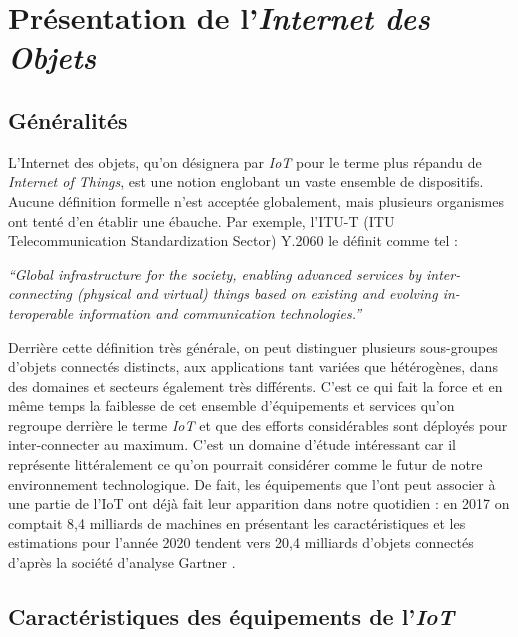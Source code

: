 \documentclass[]{article}
\begin{document}

\section{Présentation de l'\textit{Internet des Objets}}\label{IoT}

\subsection{Généralités}

\par L'Internet des objets, qu'on désignera par \textit{IoT} pour le terme plus répandu de \textit{Internet of Things}, est une notion englobant un vaste ensemble de dispositifs. Aucune définition formelle n'est acceptée globalement, mais plusieurs organismes ont tenté d'en établir une ébauche. Par exemple, l'ITU-T (ITU Telecommunication Standardization Sector) Y.2060 le définit comme tel : 
\begin{center}
\textit{“Global  infrastructure  for  the  society,  enabling  advanced  services  by  inter-connecting (physical and virtual) things based on existing and evolving in-teroperable information and communication technologies.”}
\end{center}

\par Derrière cette définition très générale, on peut distinguer plusieurs sous-groupes d'objets connectés distincts, aux applications tant variées que hétérogènes, dans des domaines et secteurs également très différents. C'est ce qui fait la force et en même temps la faiblesse de cet ensemble d'équipements et services qu'on regroupe derrière le terme \textit{IoT} et que des efforts considérables sont déployés pour inter-connecter au maximum. C'est un domaine d'étude intéressant car il représente littéralement ce qu'on pourrait considérer comme le futur de notre environnement technologique. De fait, les équipements que l'ont peut associer à une partie de l'IoT ont déjà fait leur apparition dans notre quotidien : en 2017 on comptait 8,4 milliards de machines en présentant les caractéristiques et les estimations pour l'année 2020 tendent vers 20,4 milliards d'objets connectés d'après la société d'analyse Gartner \cite{Berte2018}.  
\subsection{Caractéristiques des équipements de l'\textit{IoT}}
\end{document}
